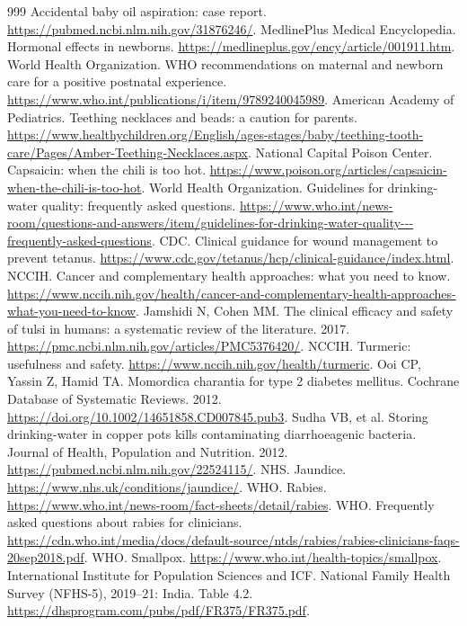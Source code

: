 \documentclass[11pt,oneside]{book}
\begin{document}
\begin{thebibliography}{999}
Accidental baby oil aspiration: case report. \url{https://pubmed.ncbi.nlm.nih.gov/31876246/}.
MedlinePlus Medical Encyclopedia. Hormonal effects in newborns. \url{https://medlineplus.gov/ency/article/001911.htm}.
World Health Organization. WHO recommendations on maternal and newborn care for a positive postnatal experience. \url{https://www.who.int/publications/i/item/9789240045989}.
American Academy of Pediatrics. Teething necklaces and beads: a caution for parents. \url{https://www.healthychildren.org/English/ages-stages/baby/teething-tooth-care/Pages/Amber-Teething-Necklaces.aspx}.
National Capital Poison Center. Capsaicin: when the chili is too hot. \url{https://www.poison.org/articles/capsaicin-when-the-chili-is-too-hot}.
World Health Organization. Guidelines for drinking-water quality: frequently asked questions. \url{https://www.who.int/news-room/questions-and-answers/item/guidelines-for-drinking-water-quality---frequently-asked-questions}.
CDC. Clinical guidance for wound management to prevent tetanus. \url{https://www.cdc.gov/tetanus/hcp/clinical-guidance/index.html}.
NCCIH. Cancer and complementary health approaches: what you need to know. \url{https://www.nccih.nih.gov/health/cancer-and-complementary-health-approaches-what-you-need-to-know}.
Jamshidi N, Cohen MM. The clinical efficacy and safety of tulsi in humans: a systematic review of the literature. 2017. \url{https://pmc.ncbi.nlm.nih.gov/articles/PMC5376420/}.
NCCIH. Turmeric: usefulness and safety. \url{https://www.nccih.nih.gov/health/turmeric}.
Ooi CP, Yassin Z, Hamid TA. Momordica charantia for type 2 diabetes mellitus. Cochrane Database of Systematic Reviews. 2012. \url{https://doi.org/10.1002/14651858.CD007845.pub3}.
Sudha VB, et al. Storing drinking-water in copper pots kills contaminating diarrhoeagenic bacteria. Journal of Health, Population and Nutrition. 2012. \url{https://pubmed.ncbi.nlm.nih.gov/22524115/}.
NHS. Jaundice. \url{https://www.nhs.uk/conditions/jaundice/}.
WHO. Rabies. \url{https://www.who.int/news-room/fact-sheets/detail/rabies}.
WHO. Frequently asked questions about rabies for clinicians. \url{https://cdn.who.int/media/docs/default-source/ntds/rabies/rabies-clinicians-faqs-20sep2018.pdf}.
WHO. Smallpox. \url{https://www.who.int/health-topics/smallpox}.
International Institute for Population Sciences and ICF. National Family Health Survey (NFHS-5), 2019--21: India. Table 4.2. \url{https://dhsprogram.com/pubs/pdf/FR375/FR375.pdf}.

\end{thebibliography}
\end{document}
